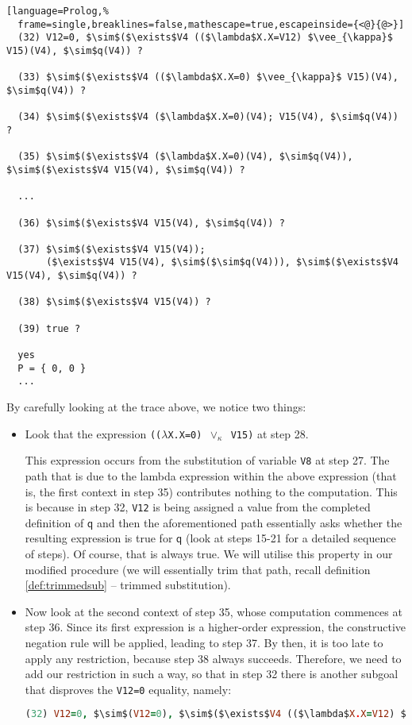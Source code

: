 \documentclass[inscr,ack,preface]{dithesis}
\theoremstyle{definition}
\newcommand{\msf}[1]{$\mathsf{#1}$}
\begin{document}
\begin{lstlisting}[language=Prolog,%
  frame=single,breaklines=false,mathescape=true,escapeinside={<@}{@>}]
  (32) V12=0, $\sim$($\exists$V4 (($\lambda$X.X=V12) $\vee_{\kappa}$ V15)(V4), $\sim$q(V4)) ?

  (33) $\sim$($\exists$V4 (($\lambda$X.X=0) $\vee_{\kappa}$ V15)(V4), $\sim$q(V4)) ?

  (34) $\sim$($\exists$V4 ($\lambda$X.X=0)(V4); V15(V4), $\sim$q(V4)) ?

  (35) $\sim$($\exists$V4 ($\lambda$X.X=0)(V4), $\sim$q(V4)), $\sim$($\exists$V4 V15(V4), $\sim$q(V4)) ?

  ...

  (36) $\sim$($\exists$V4 V15(V4), $\sim$q(V4)) ?

  (37) $\sim$($\exists$V4 V15(V4));
       ($\exists$V4 V15(V4), $\sim$($\sim$q(V4))), $\sim$($\exists$V4 V15(V4), $\sim$q(V4)) ?

  (38) $\sim$($\exists$V4 V15(V4)) ?

  (39) true ?

  yes
  P = { 0, 0 }
  ...
\end{lstlisting}

By carefully looking at the trace above, we notice two things:
\begin{itemize}
  \item Look that the expression \texttt{(($\lambda$X.X=0) $\vee_{\kappa}$ V15)} at step 28.

  This expression occurs from the substitution of variable \texttt{V8} at step 27. The path that is due to the lambda expression within the above expression (that is, the first context in step 35) contributes nothing to the computation. This is because in step 32, \texttt{V12} is being assigned a value from the completed definition of \msf{q} and then the aforementioned path essentially asks whether the resulting expression is true for \msf{q} (look at steps 15-21 for a detailed sequence of steps). Of course, that is always true. We will utilise this property in our modified procedure (we will essentially trim that path, recall definition \ref{def:trimmedsub} -- trimmed substitution).
  \item Now look at the second context of step 35, whose computation commences at step 36. Since its first expression is a higher-order expression, the constructive negation rule will be applied, leading to step 37. By then, it is too late to apply any restriction, because step 38 always succeeds. Therefore, we need to add our restriction in such a way, so that in step 32 there is another subgoal that disproves the \texttt{V12=0} equality, namely:
  \begin{lstlisting}[language=Prolog,%
    frame=single,breaklines=false,mathescape=true]
  (32) V12=0, $\sim$(V12=0), $\sim$($\exists$V4 (($\lambda$X.X=V12) $\vee_{\kappa}$ V15)(V4), $\sim$q(V4)) ?
  \end{lstlisting}
\end{itemize}
\end{document}
